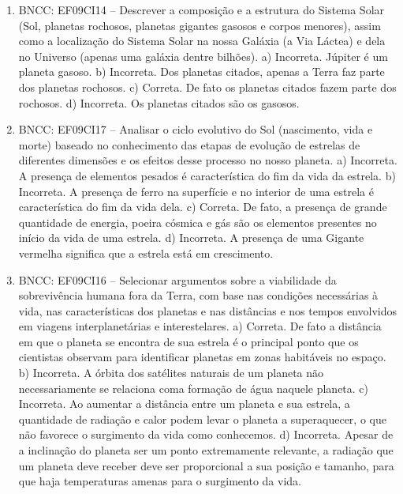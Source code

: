 \begin{enumerate}
\item
BNCC: EF09CI14 -- Descrever a composição e a estrutura
do Sistema Solar (Sol, planetas rochosos, planetas gigantes gasosos e
corpos menores), assim como a localização do Sistema Solar na nossa
Galáxia (a Via Láctea) e dela no Universo (apenas uma galáxia dentre
bilhões).
a) Incorreta. Júpiter é um planeta gasoso.
b) Incorreta. Dos planetas citados, apenas a Terra faz parte dos planetas rochosos.
c) Correta. De fato os planetas citados fazem parte dos rochosos.
d) Incorreta. Os planetas citados são os gasosos.

\item
BNCC: EF09CI17 -- Analisar o ciclo evolutivo do Sol (nascimento, vida e morte) baseado no conhecimento das etapas de evolução de estrelas de diferentes dimensões e os efeitos desse processo
no nosso planeta.
a) Incorreta. A presença de elementos pesados é
  característica do fim da vida da estrela.
b) Incorreta. A presença de ferro na superfície e no interior de uma
  estrela é característica do fim da vida dela.
c) Correta. De fato, a presença de grande quantidade de energia,
  poeira cósmica e gás são os elementos presentes no início da vida de uma estrela.
d) Incorreta. A presença de uma Gigante vermelha significa que a estrela está em crescimento.

\item
BNCC: EF09CI16 -- Selecionar argumentos sobre a
viabilidade da sobrevivência humana fora da Terra, com base nas
condições necessárias à vida, nas características dos planetas e nas
distâncias e nos tempos envolvidos em viagens interplanetárias e interestelares.
a) Correta. De fato a distância em que o planeta se encontra de sua
  estrela é o principal ponto que os cientistas observam para
  identificar planetas em zonas habitáveis no espaço.
b) Incorreta. A órbita dos satélites naturais de um planeta não
  necessariamente se relaciona coma formação de água naquele planeta.
c) Incorreta. Ao aumentar a distância entre um planeta e sua estrela,
  a quantidade de radiação e calor podem levar o planeta a superaquecer, o que não favorece o surgimento da vida como conhecemos.
d) Incorreta. Apesar de a inclinação do planeta ser um ponto
  extremamente relevante, a radiação que um planeta deve receber deve
  ser proporcional a sua posição e tamanho, para que haja temperaturas amenas para o surgimento da vida.
\end{enumerate}


